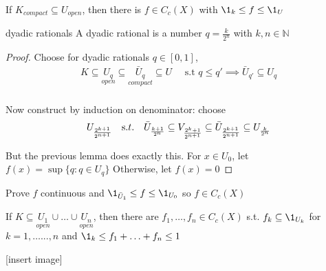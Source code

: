 \begin{lemma}
	If $K_{compact} \subseteq U_{open}$, then there is  $f \in C_{c} (X)$ with $\1_k \leq f \leq \1_U$
\end{lemma}

\begin{remark} dyadic rationals
		A dyadic rational is a number $q = \frac{k}{2^{n}}$ with $k,n \in \mathbb{N}$
\end{remark}

\begin{proof}
	Choose for dyadic rationals $q \in [0,1]$,
	\begin{align*}
		K \subseteq  {\underset {open} {U_{q}}} \subseteq {\underset {compact} {\bar{U}_{q}}} \subseteq U \quad \text{ s.t } 
		q \leq q' \implies \bar{U}_{q'} \subseteq U_{q}	\\
	\end{align*} 

	Now construct by induction on denominator: choose
	\begin{align*}
		U_{\frac{2^{k+1}}{2^{n+1}}} \quad {\text s.t. }\quad 
		\bar{U}_{\frac{k+1}{2^{n}}} \subseteq V_{\frac{2^{k} + 1}{2^{n+1}}} \subseteq \bar{U}_{\frac{2^{k+1}}{2^{n+1}}} \subseteq U_{\frac{k}{2^{n}}}
	\end{align*} 

	But the previous lemma does exactly this. For $x \in U_{0}$, let $f(x) = \sup\{q : q \in U_{q}\}$
	Otherwise, let $f(x) = 0$
\end{proof}

\begin{exercise}
	Prove $f$ continuous and $\1_{\bar{U}_1} \leq f \leq \1_{U_{0}}$ so $f \in C_c(X)$
\end{exercise}


\begin{lemma}
	If $K \subseteq \underset{open}{U_{1}} \cup \ldots \cup \underset{open}{U_n}$, then there are 
	$f_1, \ldots, f_n \in C_c(X)$ s.t. $f_k \subseteq \1_{U_{k}}$ for $k = 1, \ldots ..., n$ and
	$\1_k \leq f_1 + \ldots+ f_n \leq 1$
\end{lemma}

[insert image]

